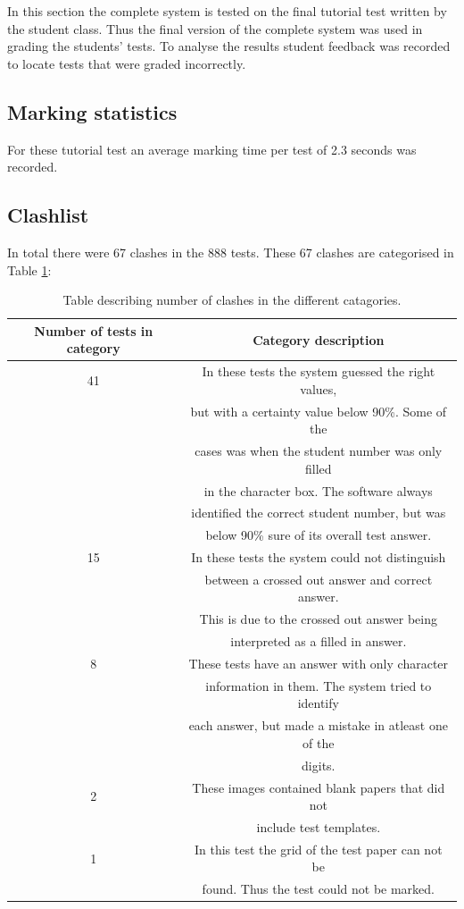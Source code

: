 In this section the complete system is tested on the final tutorial test written by the student class. Thus the final version of the complete system was used in grading the students' tests. To analyse the results student feedback was recorded to locate tests that were graded incorrectly. 

\subsection{Marking statistics}

For these tutorial test  an average marking time per test of 2.3 seconds was recorded. 

\subsection{Clashlist}

In total there were 67 clashes in the 888 tests. These 67 clashes are categorised in Table  \ref{tbl:TutClash}:
\begin{table}
  \centering
\begin{tabular}{|c|c|}
\hline
\textbf{Number of tests in category} & \textbf{Category description}\\
\hline
41&In these tests the system guessed the right values,\\ 
&but with a certainty value below 90\%. Some of the\\
&cases was when the student number was only filled\\
&in the character box. The software always\\
&identified the correct student number, but was\\
&below 90\% sure of its overall test answer.\\
\hline
15&In these tests the system could not distinguish\\ 
&between a crossed out answer and correct answer.\\
&This is due to the crossed out answer being\\
&interpreted as a filled in answer.\\
\hline
8&These tests have an answer with only character\\ 
&information in them. The system tried to identify\\
&each answer, but made a mistake in atleast one of the\\
&digits.\\
\hline
2&These images contained blank papers that did not\\ 
&include test templates.\\
\hline
1&In this test the grid of the test paper can not be\\ 
&found. Thus the test could not be marked.\\
\hline
\end{tabular}
  \caption{Table describing number of clashes in the different catagories.} \label{tbl:TutClash}
\end{table}

